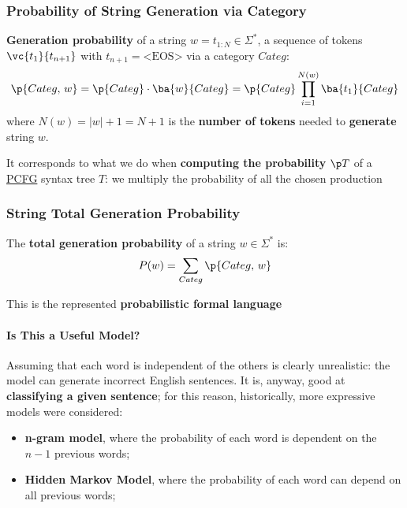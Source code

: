 \subsubsection{Probability of String Generation via Category}\label{sub:lm_probability_of_string_generation_via_category} %
\textbf{Generation probability} of a string $w = t_{1:N}\in\Sigma^*$, a sequence of tokens $\vc{t_1}{t_{n+1}}$ with $t_{n+1} = \text{<EOS>}$ via a category $Categ$:
\[
    \p{Categ,\,w} = \p{Categ} \cdot \ba{w}{Categ} = \p{Categ}\prod_{i=1}^{N(w)}\ba{t_1}{Categ}
\]
where $N(w) = |w| + 1 = N+1$ is the \textbf{number of tokens} needed to \textbf{generate} string $w$.
\begin{note}
    It corresponds to what we do when \textbf{computing the probability} $\p T$ of a \hyperref[def:pcfg]{PCFG} syntax tree $T$: we multiply the probability of all the chosen production
\end{note}
%
\subsubsection{String Total Generation Probability}\label{sub:lm_string_total_generation_probability} %
The \textbf{total generation probability} of a string $w\in\Sigma^*$ is:
\[
    P(w) = \sum_{Categ}\p{Categ,\, w}
\]
\begin{note}
    This is the represented \textbf{probabilistic formal language}
\end{note}
%
\paragraph{Is This a Useful Model?}\label{par:bow_is_this_a_useful_model} %
Assuming that each word is independent of the others is clearly unrealistic: the model can generate incorrect English sentences.
It is, anyway, good at \textbf{classifying a given sentence}; for this reason, historically, more expressive models were considered:
\begin{itemize}
    \item \textbf{n-gram model}, where the probability of each word is dependent on the $n-1$ previous words;
    \item \textbf{Hidden Markov Model}, where the probability of each word can depend on all previous words;
\end{itemize}
%
%
